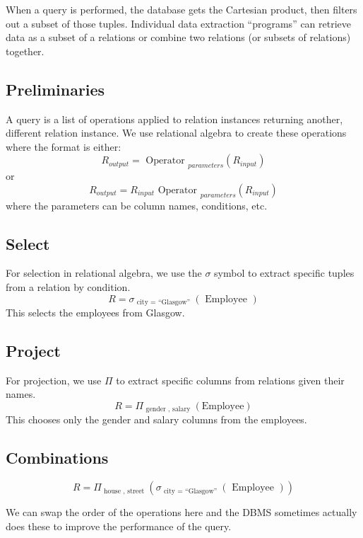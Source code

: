 When a query is performed, the database gets the Cartesian product, then filters out a subset of those tuples.
Individual data extraction ``programs'' can retrieve data as a subset of a relations or combine two relations (or subsets of relations) together.

\subsection{Preliminaries}\label{sub:preliminaries}

A query is a list of operations applied to relation instances returning another, different relation instance.
We use relational algebra to create these operations where the format is either:
\[
    R_{output}=\text{ Operator }_{parameters} (R_{input})
\]
or
\[
    R_{output}=R_{input} \text{ Operator }_{parameters} (R_{input})
\]
where the parameters can be column names, conditions, etc.

\subsection{Select}\label{sub:selectdsrsix}

For selection in relational algebra, we use the \(\sigma\) symbol to extract specific tuples from a relation by condition.
\[
    R=\sigma_{\text{ city }=\text{ ``Glasgow'' }}(\text{ Employee })
\]
This selects the employees from Glasgow.

\subsection{Project}\label{sub:subsectiproject_label_sub_sub}

For projection, we use \(\Pi\) to extract specific columns from relations given their names.
\[
    R=\Pi_{\text{ gender }, \text{ salary }}(\text{Employee})
\]
This chooses only the gender and salary columns from the employees.

\subsection{Combinations}\label{sub:combinationsdsrsix}

\[
    R=\Pi_{\text{ house }, \text{ street }}(\sigma_{\text{ city }=\text{ ``Glasgow'' }}(\text{ Employee }))
\]
\begin{note}
    We can swap the order of the operations here and the DBMS sometimes actually does these to improve the performance of the query.
\end{note}

